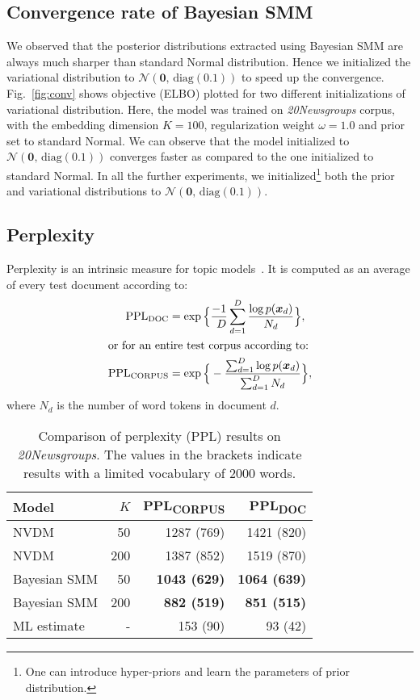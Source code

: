\documentclass[journal]{IEEEtran}
\newcommand{\mb}[1]{\bm{#1}}
\newcommand{\Nor}{\(\mathrm{Normal}\)}
\newcommand{\myfrac}[2]{\setbox0\hbox{$#1$}        \dimen0=\wd0               \setbox1\hbox{$#2$}        \dimen1=\wd1               \ifdim\wd0<\wd1            \dfrac{\hfill#1}{#2}     \else
	\dfrac{#1}{\hfill#2}     \fi
}
\begin{document}
\subsection{Convergence rate of Bayesian SMM}
\label{ssec:conv}
We observed that the posterior distributions extracted using Bayesian SMM are
always much sharper than standard Normal distribution. Hence we initialized 
the variational distribution to \(\mathcal{N}(\mb{0},\, \mathrm{diag}(0.1))\) 
to speed up the convergence. Fig.~\ref{fig:conv} shows objective (ELBO) plotted 
for two different initializations of variational distribution. Here, the model 
was trained on \textit{20Newsgroups} corpus, with the embedding dimension 
\(K=100\), regularization weight \(\omega=1.0\) and prior 
set to standard \Nor. We can observe that the model initialized to 
\(\mathcal{N}(\mb{0}, \, \mathrm{diag}(0.1))\)
converges faster as compared to the one initialized to standard \Nor. In all 
the further experiments, we initialized\footnote{One can introduce hyper-priors 
and learn the parameters of prior distribution.} both the prior and variational 
distributions to \(\mathcal{N}(\mb{0}, \,\mathrm{diag}(0.1))\).



 
\subsection{Perplexity}
Perplexity is an intrinsic measure for topic 
models~\cite{DBM:2013:Hinton,NVI:2016}. It is computed as an average of 
every test document according to:
\begin{align}
\textrm{PPL\textsubscript{DOC}} &= \exp\Big\{\myfrac{-1}{D} \sum_{d=1}^{D} 
\frac{\log p(\mb{x}_d)}{N_d}\Big\}, \\
\intertext{or for an entire test corpus according to:}
\textrm{PPL\textsubscript{CORPUS}} &= \exp\Big\{-\frac{\sum_{d=1}^{D} \log 
p(\mb{x}_d)}{\sum_{d=1}^{D} N_d}\Big\},
\end{align}
where \(N_d\) is the number of word tokens in document \(d\).

\begin{table}[t!]
	\begin{center}
		\caption{\label{tab:ppl}Comparison of perplexity (PPL) results on 
			\textit{20Newsgroups}. The values in the brackets indicate results 
			with 
			a limited vocabulary of 2000 words.}
		\begin{tabular}{lrrr} \toprule
			\textbf{Model}  & \(K\) & PPL\textsubscript{CORPUS} & 
			PPL\textsubscript{DOC} \\ \midrule
			NVDM         & 50   &  1287 (769) & 1421 (820)  \\
			NVDM         & 200  &  1387 (852) & 1519 (870)  \\
			Bayesian SMM & 50   & \textbf{1043 (629)} & \textbf{1064 (639)}  \\
			Bayesian SMM & 200  & \textbf{882 (519)} & \textbf{851 (515)}  \\ 
			\midrule
			ML estimate  &  -   & 153 (90)  & 93 (42) \\ \bottomrule
		\end{tabular}
	\end{center}
\end{table}
\end{document}
